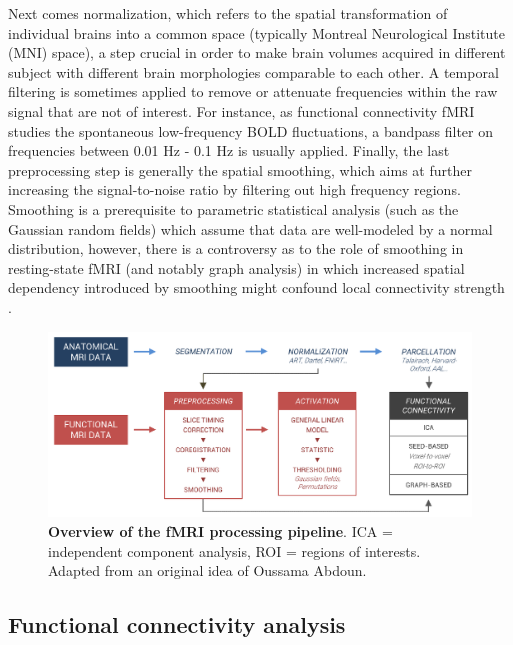 Next comes normalization, which refers to the spatial transformation of individual brains into a common space (typically Montreal Neurological Institute (MNI) space), a step crucial in order to make brain volumes acquired in different subject with different brain morphologies comparable to each other. A temporal filtering is sometimes applied to remove or attenuate frequencies within the raw signal that are not of interest. For instance, as functional connectivity fMRI studies the spontaneous low-frequency BOLD fluctuations, a bandpass filter on frequencies between 0.01 Hz - 0.1 Hz is usually applied. Finally, the last preprocessing step is generally the spatial smoothing, which aims at further increasing the signal-to-noise ratio by filtering out high frequency regions. Smoothing is a prerequisite to parametric statistical analysis (such as the Gaussian random fields) which assume that data are well-modeled by a normal distribution, however, there is a controversy as to the role of smoothing in resting-state fMRI (and notably graph analysis) in which increased spatial dependency introduced by smoothing might confound local connectivity strength \citep{hayasaka_comparison_2010}.

\begin{figure}[!htb]
	\includegraphics[width=\textwidth]{Fig/Methods/fMRI_pipeline/fMRI_pipeline_perso.png}
	\caption[Overview of the fMRI processing pipeline]{\textbf{Overview of the fMRI processing pipeline}. ICA = independent component analysis, ROI = regions of interests. Adapted from an original idea of Oussama Abdoun.}
	\label{fig:methods:fmri-pipeline}
\end{figure}

\subsection{Functional connectivity analysis}
\label{sec:fmri:rs:analysis}

